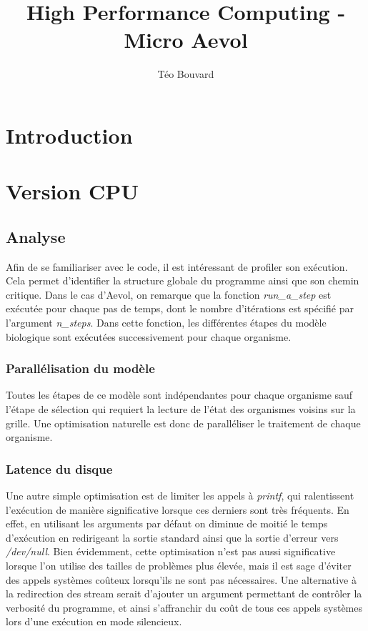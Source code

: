 \documentclass[a4paper, 10pt, twoside]{article}
\begin{document}
\title{High Performance Computing - Micro Aevol}
\author{T\'eo Bouvard}
\maketitle

\section{Introduction}

\section{Version CPU}

\subsection{Analyse}

Afin de se familiariser avec le code, il est intéressant de profiler son exécution. Cela permet d'identifier la structure globale du programme ainsi que son chemin critique. Dans le cas d'Aevol, on remarque que la fonction \textit{run\_a\_step} est exécutée pour chaque pas de temps, dont le nombre d'itérations est spécifié par l'argument \textit{n\_steps}.
Dans cette fonction, les différentes étapes du modèle biologique sont exécutées successivement pour chaque organisme.

\subsubsection*{Parallélisation du modèle}

Toutes les étapes de ce modèle sont indépendantes pour chaque organisme sauf l'étape de sélection qui requiert la lecture de l'état des organismes voisins sur la grille. Une optimisation naturelle est donc de paralléliser le traitement de chaque organisme\label{parallel/orga}.

\subsubsection*{Latence du disque}

Une autre simple optimisation est de limiter les appels à \textit{printf}, qui ralentissent l'exécution de manière significative lorsque ces derniers sont très fréquents. En effet, en utilisant les arguments par défaut on diminue de moitié le temps d'exécution en redirigeant la sortie standard ainsi que la sortie d'erreur vers \textit{/dev/null}. Bien évidemment, cette optimisation n'est pas aussi significative lorsque l'on utilise des tailles de problèmes plus élevée, mais il est sage d'éviter des appels systèmes coûteux lorsqu'ils ne sont pas nécessaires. Une alternative à la redirection des stream serait d'ajouter un argument permettant de contrôler la verbosité du programme, et ainsi s'affranchir du coût de tous ces appels systèmes lors d'une exécution en mode silencieux.
\end{document}
